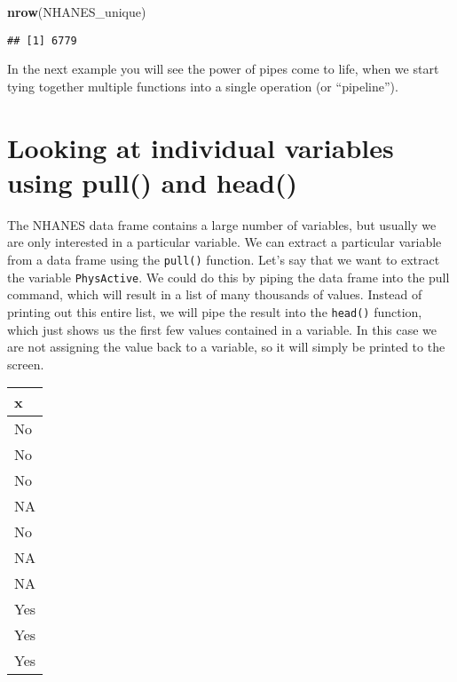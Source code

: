 \documentclass[12pt,]{book}
\newenvironment{Shaded}{\begin{snugshade}}{\end{snugshade}}
\newcommand{\CommentTok}[1]{\textcolor[rgb]{0.56,0.35,0.01}{\textit{#1}}}
\newcommand{\DecValTok}[1]{\textcolor[rgb]{0.00,0.00,0.81}{#1}}
\newcommand{\KeywordTok}[1]{\textcolor[rgb]{0.13,0.29,0.53}{\textbf{#1}}}
\newcommand{\NormalTok}[1]{#1}
\newcommand{\OperatorTok}[1]{\textcolor[rgb]{0.81,0.36,0.00}{\textbf{#1}}}
\newcommand{\StringTok}[1]{\textcolor[rgb]{0.31,0.60,0.02}{#1}}
\begin{document}
\begin{Shaded}
\begin{Highlighting}[]
\KeywordTok{nrow}\NormalTok{(NHANES_unique)}
\end{Highlighting}
\end{Shaded}

\begin{verbatim}
## [1] 6779
\end{verbatim}

In the next example you will see the power of pipes come to life, when we start tying together multiple functions into a single operation (or ``pipeline'').

\hypertarget{looking-at-individual-variables-using-pull-and-head}{%
\section{Looking at individual variables using pull() and head()}\label{looking-at-individual-variables-using-pull-and-head}}

The NHANES data frame contains a large number of variables, but usually we are only interested in a particular variable. We can extract a particular variable from a data frame using the \texttt{pull()} function. Let's say that we want to extract the variable \texttt{PhysActive}. We could do this by piping the data frame into the pull command, which will result in a list of many thousands of values. Instead of printing out this entire list, we will pipe the result into the \texttt{head()} function, which just shows us the first few values contained in a variable. In this case we are not assigning the value back to a variable, so it will simply be printed to the screen.

\begin{Shaded}
\end{Shaded}

\begin{tabular}{l}
\hline
x\\
\hline
No\\
\hline
No\\
\hline
No\\
\hline
NA\\
\hline
No\\
\hline
NA\\
\hline
NA\\
\hline
Yes\\
\hline
Yes\\
\hline
Yes\\
\hline
\end{tabular}
\end{document}
